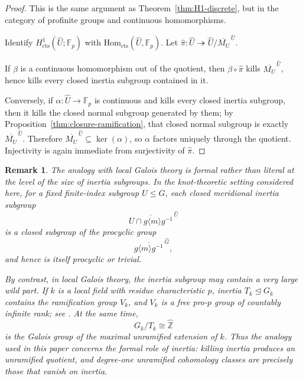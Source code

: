 \documentclass[11pt]{article}
\newtheorem{remark}[theorem]{Remark}
\begin{document}
\begin{proof}
	This is the same argument as Theorem~\ref{thm:H1-discrete}, but in the category of profinite groups and continuous homomorphisms.
	
	Identify $H^1_{\mathrm{cts}}(\widehat U;\mathbb F_p)$ with $\mathrm{Hom}_{\mathrm{cts}}(\widehat U,\mathbb F_p)$. Let $\widehat\pi:\widehat U\twoheadrightarrow \widehat U/\overline{M_U}^{\,\widehat U}$.
	
	If $\beta$ is a continuous homomorphism out of the quotient, then $\beta\circ\widehat\pi$ kills $\overline{M_U}^{\,\widehat U}$, hence kills every closed inertia subgroup contained in it.
	
	Conversely, if $\alpha:\widehat U\to\mathbb F_p$ is continuous and kills every closed inertia subgroup, then it kills the closed normal subgroup generated by them; by Proposition~\ref{thm:closure-ramification}, that closed normal subgroup is exactly $\overline{M_U}^{\,\widehat U}$. Therefore $\overline{M_U}^{\,\widehat U}\subseteq \ker(\alpha)$, so $\alpha$ factors uniquely through the quotient. Injectivity is again immediate from surjectivity of $\widehat\pi$.
\end{proof}



\begin{remark}%
The analogy with local Galois theory is formal rather than literal at the
level of the size of inertia subgroups. In the knot-theoretic setting considered here, for a fixed finite-index subgroup $U\leq G$, each closed meridional inertia subgroup \[ \overline{U\cap g\langle m\rangle g^{-1}}^{\,\widehat U} \] is a closed subgroup of the procyclic group
\[ \overline{g\langle m\rangle g^{-1}}^{\,\widehat G}, \] and hence is itself procyclic or trivial.

By contrast, in local Galois theory, the inertia subgroup may contain a very large wild part. If $k$ is a local field with residue characteristic $p$, inertia $T_k\trianglelefteq G_k$ contains the ramification group $V_k$, and $V_k$ is a free pro-$p$ group of countably infinite rank; see \cite[Chap.~VII, \S5]{NSW}. At the same time, \[ G_k/T_k\cong \widehat{\mathbb Z}\] is the Galois group of the maximal unramified extension of $k$. Thus the analogy used in this paper concerns the formal role of inertia: killing inertia produces an unramified quotient, and degree-one unramified cohomology classes are precisely those that vanish on inertia.\end{remark}
\end{document}

